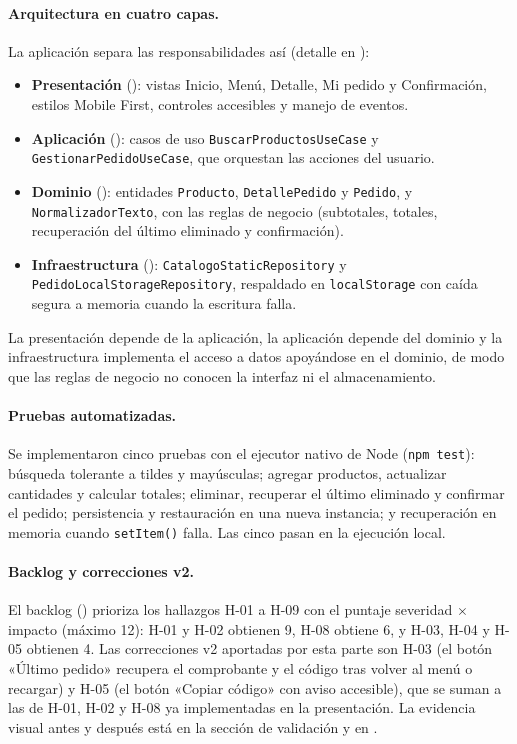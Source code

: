 \paragraph{Arquitectura en cuatro capas.} La aplicación separa las responsabilidades así (detalle en ):
\begin{itemize}
    \item \textbf{Presentación} (): vistas Inicio, Menú, Detalle, Mi pedido y Confirmación, estilos Mobile First, controles accesibles y manejo de eventos.
    \item \textbf{Aplicación} (): casos de uso \texttt{BuscarProductosUseCase} y \texttt{GestionarPedidoUseCase}, que orquestan las acciones del usuario.
    \item \textbf{Dominio} (): entidades \texttt{Producto}, \texttt{DetallePedido} y \texttt{Pedido}, y \texttt{NormalizadorTexto}, con las reglas de negocio (subtotales, totales, recuperación del último eliminado y confirmación).
    \item \textbf{Infraestructura} (): \texttt{CatalogoStaticRepository} y \texttt{PedidoLocalStorageRepository}, respaldado en \texttt{localStorage} con caída segura a memoria cuando la escritura falla.
\end{itemize}
La presentación depende de la aplicación, la aplicación depende del dominio y la infraestructura implementa el acceso a datos apoyándose en el dominio, de modo que las reglas de negocio no conocen la interfaz ni el almacenamiento.

\paragraph{Pruebas automatizadas.} Se implementaron cinco pruebas con el ejecutor nativo de Node (\texttt{npm test}): búsqueda tolerante a tildes y mayúsculas; agregar productos, actualizar cantidades y calcular totales; eliminar, recuperar el último eliminado y confirmar el pedido; persistencia y restauración en una nueva instancia; y recuperación en memoria cuando \texttt{setItem()} falla. Las cinco pasan en la ejecución local.

\paragraph{Backlog y correcciones v2.} El backlog () prioriza los hallazgos H-01 a H-09 con el puntaje severidad $\times$ impacto (máximo 12): H-01 y H-02 obtienen 9, H-08 obtiene 6, y H-03, H-04 y H-05 obtienen 4. Las correcciones v2 aportadas por esta parte son H-03 (el botón «Último pedido» recupera el comprobante y el código tras volver al menú o recargar) y H-05 (el botón «Copiar código» con aviso accesible), que se suman a las de H-01, H-02 y H-08 ya implementadas en la presentación. La evidencia visual antes y después está en la sección de validación y en .
